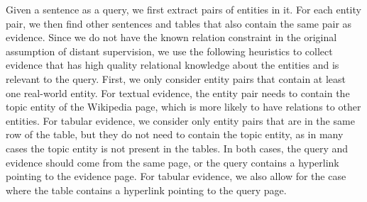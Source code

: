 \documentclass[11pt]{article}
\begin{document}
Given a sentence as a query, we first extract pairs of entities in it. For each entity pair, we then find other sentences and tables that also contain the same pair as evidence. {Since we do not have the known relation constraint {in the original assumption of distant supervision}, we use the following heuristics to collect evidence that has high quality relational knowledge about the entities and is relevant to the query. First, we only consider entity pairs that contain at least one real-world entity. For textual evidence, the entity pair needs to contain the topic entity of the Wikipedia page, which is more likely to have relations to other entities. For tabular evidence, we consider only entity pairs that are in the same row of the table, but they do not need to contain the topic entity, as in many cases the topic entity is not present in the tables. In both cases, the query and evidence should come from the same page, or the query contains a hyperlink pointing to the evidence page. For tabular evidence, we also allow for the case where the table contains a hyperlink pointing to the query page.}

\begin{table}[t]
    \centering
    \vspace{-0.5em}
    \caption{Statistics about the pre-training data.}\vspace{-0.25em}
    \label{tab:pretrain_data}
\end{table}
\end{document}
